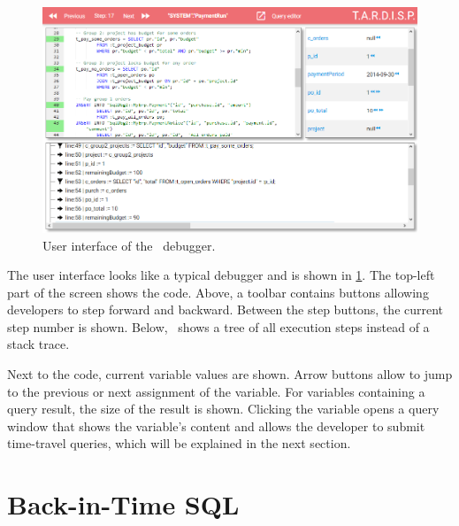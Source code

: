 \begin{figure}
	\centering
		\includegraphics[width=\linewidth]{img/odb.png}
	\caption{User interface of the \tool\ debugger.}
	\label{fig:odb}
\end{figure}

The user interface looks like a typical debugger and is shown in \cref{fig:odb}.
The top-left part of the screen shows the code.
Above, a toolbar contains buttons allowing developers to step forward and backward.
Between the step buttons, the current step number is shown.
Below, \tool\ shows a tree of all execution steps instead of a stack trace.

Next to the code, current variable values are shown.
Arrow buttons allow to jump to the previous or next assignment of the variable.
For variables containing a query result, the size of the result is shown.
Clicking the variable opens a query window that shows the variable's content and allows the developer to submit time-travel queries, which will be explained in the next section.

\section{Back-in-Time SQL}



